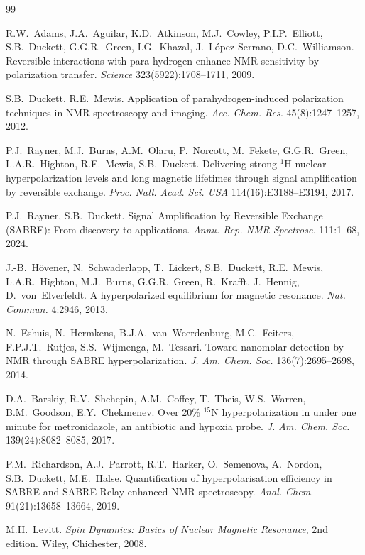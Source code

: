 \documentclass{article}
\begin{document}
{
\small

\begin{thebibliography}{99}

R.W.~Adams, J.A.~Aguilar, K.D.~Atkinson, M.J.~Cowley, P.I.P.~Elliott, S.B.~Duckett, G.G.R.~Green, I.G.~Khazal, J.~López-Serrano, D.C.~Williamson.
Reversible interactions with para-hydrogen enhance NMR sensitivity by polarization transfer.
\textit{Science} 323(5922):1708--1711, 2009.

S.B.~Duckett, R.E.~Mewis.
Application of parahydrogen-induced polarization techniques in NMR spectroscopy and imaging.
\textit{Acc. Chem. Res.} 45(8):1247--1257, 2012.

P.J.~Rayner, M.J.~Burns, A.M.~Olaru, P.~Norcott, M.~Fekete, G.G.R.~Green, L.A.R.~Highton, R.E.~Mewis, S.B.~Duckett.
Delivering strong $^1$H nuclear hyperpolarization levels and long magnetic lifetimes through signal amplification by reversible exchange.
\textit{Proc. Natl. Acad. Sci. USA} 114(16):E3188--E3194, 2017.

P.J.~Rayner, S.B.~Duckett.
Signal Amplification by Reversible Exchange (SABRE): From discovery to applications.
\textit{Annu. Rep. NMR Spectrosc.} 111:1--68, 2024.

J.-B.~Hövener, N.~Schwaderlapp, T.~Lickert, S.B.~Duckett, R.E.~Mewis, L.A.R.~Highton, M.J.~Burns, G.G.R.~Green, R.~Krafft, J.~Hennig, D.~von~Elverfeldt.
A hyperpolarized equilibrium for magnetic resonance.
\textit{Nat. Commun.} 4:2946, 2013.

N.~Eshuis, N.~Hermkens, B.J.A.~van~Weerdenburg, M.C.~Feiters, F.P.J.T.~Rutjes, S.S.~Wijmenga, M.~Tessari.
Toward nanomolar detection by NMR through SABRE hyperpolarization.
\textit{J. Am. Chem. Soc.} 136(7):2695--2698, 2014.

D.A.~Barskiy, R.V.~Shchepin, A.M.~Coffey, T.~Theis, W.S.~Warren, B.M.~Goodson, E.Y.~Chekmenev.
Over 20\% $^{15}$N hyperpolarization in under one minute for metronidazole, an antibiotic and hypoxia probe.
\textit{J. Am. Chem. Soc.} 139(24):8082--8085, 2017.

P.M.~Richardson, A.J.~Parrott, R.T.~Harker, O.~Semenova, A.~Nordon, S.B.~Duckett, M.E.~Halse.
Quantification of hyperpolarisation efficiency in SABRE and SABRE-Relay enhanced NMR spectroscopy.
\textit{Anal. Chem.} 91(21):13658--13664, 2019.

M.H.~Levitt.
\textit{Spin Dynamics: Basics of Nuclear Magnetic Resonance}, 2nd edition.
Wiley, Chichester, 2008.


\end{thebibliography}}
\end{document}

